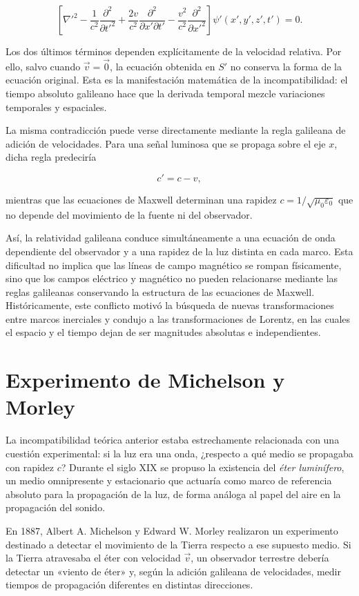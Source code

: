 \[
    \left[
        \nabla'^2
        -\frac{1}{c^2}\frac{\partial^2}{\partial t'^2}
        +\frac{2v}{c^2}\frac{\partial^2}{\partial x'\partial t'}
        -\frac{v^2}{c^2}\frac{\partial^2}{\partial x'^2}
    \right]\psi'(x',y',z',t')=0.
\]

Los dos últimos términos dependen explícitamente de la velocidad relativa. Por ello, salvo cuando $\vec{v}=\vec{0}$, la ecuación obtenida en $S'$ no conserva la forma de la ecuación original. Esta es la manifestación matemática de la incompatibilidad: el tiempo absoluto galileano hace que la derivada temporal mezcle variaciones temporales y espaciales.

La misma contradicción puede verse directamente mediante la regla galileana de adición de velocidades. Para una señal luminosa que se propaga sobre el eje $x$, dicha regla predeciría

\[
    c'=c-v,
\]

mientras que las ecuaciones de Maxwell determinan una rapidez $c=1/\sqrt{\mu_0\varepsilon_0}$ que no depende del movimiento de la fuente ni del observador.

Así, la relatividad galileana conduce simultáneamente a una ecuación de onda dependiente del observador y a una rapidez de la luz distinta en cada marco. Esta dificultad no implica que las líneas de campo magnético se rompan físicamente, sino que los campos eléctrico y magnético no pueden relacionarse mediante las reglas galileanas conservando la estructura de las ecuaciones de Maxwell. Históricamente, este conflicto motivó la búsqueda de nuevas transformaciones entre marcos inerciales y condujo a las transformaciones de Lorentz, en las cuales el espacio y el tiempo dejan de ser magnitudes absolutas e independientes.

\section{Experimento de Michelson y Morley}

La incompatibilidad teórica anterior estaba estrechamente relacionada con una cuestión experimental: si la luz era una onda, ¿respecto a qué medio se propagaba con rapidez $c$? Durante el siglo XIX se propuso la existencia del \textit{éter luminífero}, un medio omnipresente y estacionario que actuaría como marco de referencia absoluto para la propagación de la luz, de forma análoga al papel del aire en la propagación del sonido.

En 1887, Albert A. Michelson y Edward W. Morley realizaron un experimento destinado a detectar el movimiento de la Tierra respecto a ese supuesto medio. Si la Tierra atravesaba el éter con velocidad $\vec{v}$, un observador terrestre debería detectar un «viento de éter» y, según la adición galileana de velocidades, medir tiempos de propagación diferentes en distintas direcciones.

